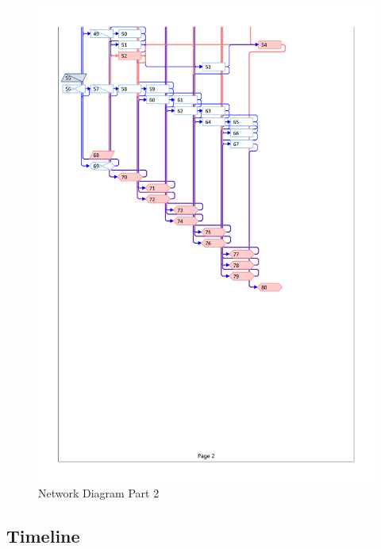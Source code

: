 \begin{appendices}
\begin{figure}[H]
\includegraphics[scale=0.2333]{network_diagram/network_diagram-2.png}
\caption{Network Diagram Part 2}
\end{figure}




\begin{landscape}

\section{Timeline}


\end{landscape}
\end{appendices}
